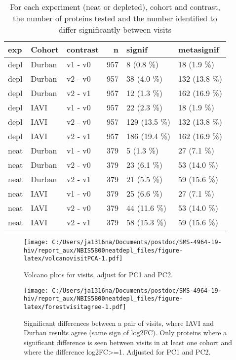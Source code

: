 \documentclass[
]{article}
\begin{document}
\begin{table}

\caption{\label{tab:signifvisitbothPCA}For each experiment (neat or depleted), cohort and contrast, the number of proteins tested and the number identified to differ significantly between visits}
\centering
\begin{tabular}[t]{l|l|l|r|l|l}
\hline
exp & Cohort & contrast & n & signif & metasignif\\
\hline
depl & Durban & v1 - v0 & 957 & 8 (0.8 \%) & 18 (1.9 \%)\\
\hline
depl & Durban & v2 - v0 & 957 & 38 (4.0 \%) & 132 (13.8 \%)\\
\hline
depl & Durban & v2 - v1 & 957 & 12 (1.3 \%) & 162 (16.9 \%)\\
\hline
depl & IAVI & v1 - v0 & 957 & 22 (2.3 \%) & 18 (1.9 \%)\\
\hline
depl & IAVI & v2 - v0 & 957 & 129 (13.5 \%) & 132 (13.8 \%)\\
\hline
depl & IAVI & v2 - v1 & 957 & 186 (19.4 \%) & 162 (16.9 \%)\\
\hline
neat & Durban & v1 - v0 & 379 & 5 (1.3 \%) & 27 (7.1 \%)\\
\hline
neat & Durban & v2 - v0 & 379 & 23 (6.1 \%) & 53 (14.0 \%)\\
\hline
neat & Durban & v2 - v1 & 379 & 21 (5.5 \%) & 59 (15.6 \%)\\
\hline
neat & IAVI & v1 - v0 & 379 & 25 (6.6 \%) & 27 (7.1 \%)\\
\hline
neat & IAVI & v2 - v0 & 379 & 44 (11.6 \%) & 53 (14.0 \%)\\
\hline
neat & IAVI & v2 - v1 & 379 & 58 (15.3 \%) & 59 (15.6 \%)\\
\hline
\end{tabular}
\end{table}

\begin{figure}
\centering
\texttt{[image: C:/Users/ja1316na/Documents/postdoc/SMS-4964-19-hiv/report\_aux/NBIS5800neatdepl\_files/figure-latex/volcanovisitPCA-1.pdf]}
\caption{\label{fig:volcanovisitPCA}Volcano plots for visits, adjust for PC1 and PC2.}
\end{figure}

\begin{figure}
\centering
\texttt{[image: C:/Users/ja1316na/Documents/postdoc/SMS-4964-19-hiv/report\_aux/NBIS5800neatdepl\_files/figure-latex/forestvisitagree-1.pdf]}
\caption{\label{fig:forestvisitagree}Significant differences between a pair of visits, where IAVI and Durban results agree (same sign of log2FC). Only proteins where a significant difference is seen between visits in at least one cohort and where the difference \textbar log2FC\textbar\textgreater=1. Adjusted for PC1 and PC2.}
\end{figure}
\end{document}
